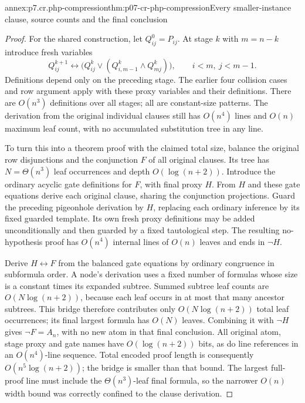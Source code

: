 \begin{annexitem}{annex:p7.cr.php-compression}{thm:p07-cr-php-compression}{Every smaller-instance clause, source counts and the final conclusion}
\begin{proof}
For the shared construction, let \(Q^0_{ij}=P_{ij}\).
At stage \(k\) with \(m=n-k\) introduce fresh variables
\[
 Q^{k+1}_{ij}\leftrightarrow
 \bigl(Q^k_{ij}\lor(Q^k_{i,m-1}\land Q^k_{mj})\bigr),
 \qquad i<m,\ j<m-1.
\]
Definitions depend only on the preceding stage. The earlier
four collision cases and row argument apply with these proxy
variables and their definitions. There are \(O(n^3)\) definitions
over all stages; all are constant-size patterns. The derivation
from the original individual clauses still has \(O(n^4)\) lines
and \(O(n)\) maximum leaf count, with no accumulated substitution
tree in any line.

To turn this into a theorem proof with the claimed total size,
balance the original row disjunctions and the conjunction \(F\)
of all original clauses. Its tree has \(N=\Theta(n^3)\) leaf
occurrences and depth \(O(\log(n+2))\). Introduce the ordinary
acyclic gate definitions for \(F\), with final proxy \(H\). From \(H\)
and these gate equations derive each original clause, sharing
the conjunction projections. Guard the preceding pigeonhole
derivation by \(H\), replacing each ordinary inference by its fixed
guarded template. Its own fresh proxy definitions may be added
unconditionally and then guarded by a fixed tautological step.
The resulting no-hypothesis proof has \(O(n^4)\) internal lines
of \(O(n)\) leaves and ends in \(\neg H\).

Derive \(H\leftrightarrow F\) from the balanced gate equations
by ordinary congruence in subformula order. A node's derivation
uses a fixed number of formulas whose size is a constant times
its expanded subtree. Summed subtree leaf counts are
\(O(N\log(n+2))\), because each leaf occurs in at most that many
ancestor subtrees. This bridge therefore contributes only
\(O(N\log(n+2))\) total leaf occurrences; its final largest formula
has \(O(N)\) leaves. Combining it with \(\neg H\) gives
\(\neg F=A_n\), with no new atom in that final conclusion.
All original atom, stage proxy and gate names have \(O(\log(n+2))\)
bits, as do line references in an \(O(n^4)\)-line sequence. Total
encoded proof length is consequently \(O(n^5\log(n+2))\); the
bridge is smaller than that bound. The largest full-proof line
must include the \(\Theta(n^3)\)-leaf final formula, so the narrower
\(O(n)\) width bound was correctly confined to the clause derivation.
\end{proof}
\end{annexitem}

